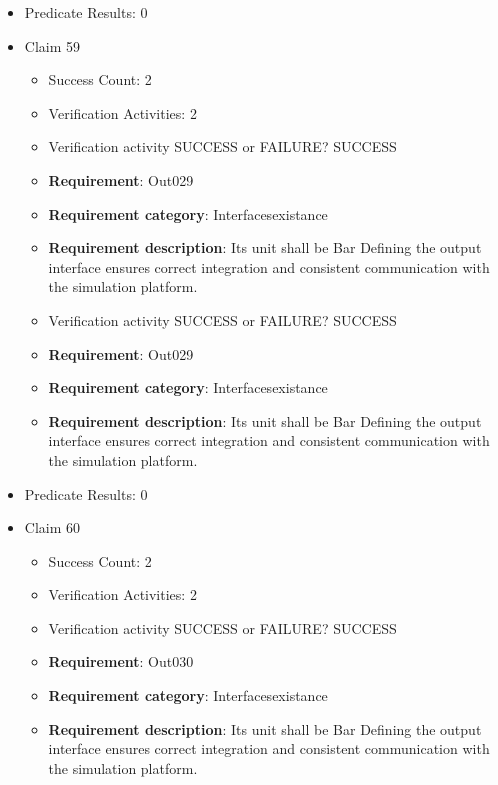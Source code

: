 \documentclass{article}
\begin{document}
\begin{itemize}
\begin{itemize}
				\end{itemize}
				
									    
				\item Predicate Results: 0

  				  \item Claim 59
				\begin{itemize}
			    	\item Success Count: 2 
			    	\item Verification Activities: 2
					\item Verification activity SUCCESS or FAILURE? SUCCESS
		
						\item \textbf{Requirement}: Out029 
						\item \textbf{Requirement category}: Interfacesexistance 
						\item \textbf{Requirement description}: Its unit shall be Bar Defining the output interface ensures correct integration and consistent communication with the simulation platform.
					
					\item Verification activity SUCCESS or FAILURE? SUCCESS
		
						\item \textbf{Requirement}: Out029 
						\item \textbf{Requirement category}: Interfacesexistance 
						\item \textbf{Requirement description}: Its unit shall be Bar Defining the output interface ensures correct integration and consistent communication with the simulation platform.
					
				\end{itemize}
				
									    
				\item Predicate Results: 0

  				  \item Claim 60
				\begin{itemize}
			    	\item Success Count: 2 
			    	\item Verification Activities: 2
					\item Verification activity SUCCESS or FAILURE? SUCCESS
		
						\item \textbf{Requirement}: Out030 
						\item \textbf{Requirement category}: Interfacesexistance 
						\item \textbf{Requirement description}: Its unit shall be Bar Defining the output interface ensures correct integration and consistent communication with the simulation platform.
					

\end{itemize}
\end{itemize}
\end{document}
